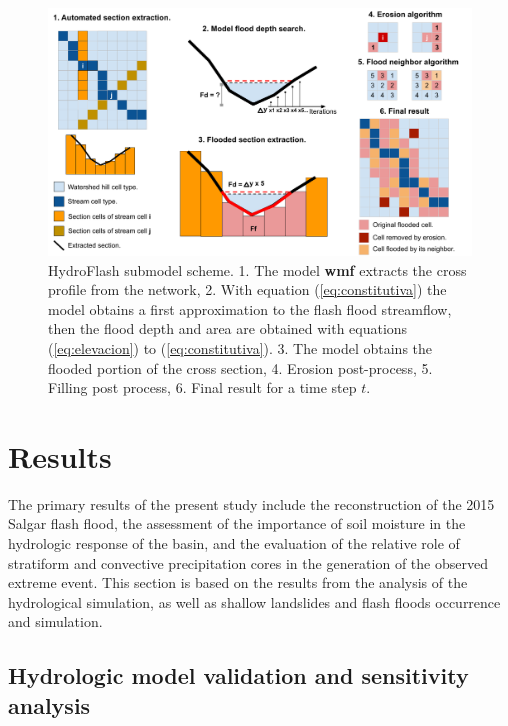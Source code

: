 \documentclass[hess, manuscript]{copernicus}
\begin{document}
\begin{figure}[t]
\centering
 \includegraphics[width=12cm]{Figures/HydroFlash_scheme.png}
 \caption{HydroFlash submodel scheme. 1. The model \textbf{wmf} extracts the cross profile from the network, 2. With equation (\ref{eq:constitutiva}) the model obtains a first approximation to the flash flood streamflow, then the flood depth and area are obtained with equations (\ref{eq:elevacion}) to (\ref{eq:constitutiva}). 3. The model obtains the flooded portion of the cross section, 4. Erosion post-process, 5. Filling post process, 6. Final result for a time step $t$.}
    \label{fig:hydroflash}
\end{figure}

\section{Results}
\label{sec:results}

The primary results of the present study include the reconstruction of the 2015 Salgar flash flood, the assessment of the importance of soil moisture in the hydrologic response of the basin, and the evaluation of the relative role of stratiform and convective precipitation cores in the generation of the observed extreme event. This section is based on the results from the analysis of the hydrological simulation, as well as shallow landslides and flash floods occurrence and simulation. \\

\subsection{Hydrologic model validation and sensitivity analysis}
\end{document}
